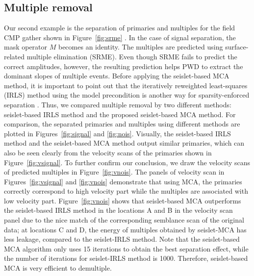 
% 
  

\subsection{Multiple removal}

Our second example is the separation of primaries and multiples for the field CMP gather shown in Figure~\ref{fig:srme} \citep{fomel2006regularizing}. In the case of signal separation, the mask operator $M$ becomes an identity.
The multiples are predicted using surface-related multiple elimination (SRME). Even though SRME fails to predict the correct amplitudes, however, the resulting prediction helps PWD to extract the dominant slopes of multiple events. 
Before applying the seislet-based MCA method, it is important to point out that the iteratively reweighted least-squares (IRLS) method using the model precondition is another way for sparsity-enforced separation \citep{daubechies2010}. Thus, we compared multiple removal by two different methods: seislet-based IRLS method and the proposed seislet-based MCA method. For comparison, the separated primaries and multiples using different methods are plotted in Figures~\ref{fig:signal} and  \ref{fig:nois}. Visually, the seislet-based IRLS method and the seislet-based MCA method output similar primaries, which can also be seen clearly from the velocity scans of the primaries shown in Figure~\ref{fig:vsignal}. To further confirm our conclusion, we draw the velocity scans of predicted multiples in Figure~\ref{fig:vnois}. The panels of velocity scan in Figures~\ref{fig:vsignal} and \ref{fig:vnois} demonstrate that using MCA, the primaries correctly correspond to high velocity part while the multiples are associated with low velocity part. Figure~\ref{fig:vnois} shows that seislet-based MCA outperforms the seislet-based IRLS method in the locations A and B in the velocity scan panel due to the nice match of the corresponding semblance scan of the original data; at locations C and D, the energy of multiples obtained by seislet-MCA has less leakage, compared to the seislet-IRLS method. Note that the seislet-based MCA algorithm only uses 15 iterations to obtain the best separation effect, while the number of iterations for seislet-IRLS method is 1000. Therefore, seislet-based MCA is very efficient to demultiple.


